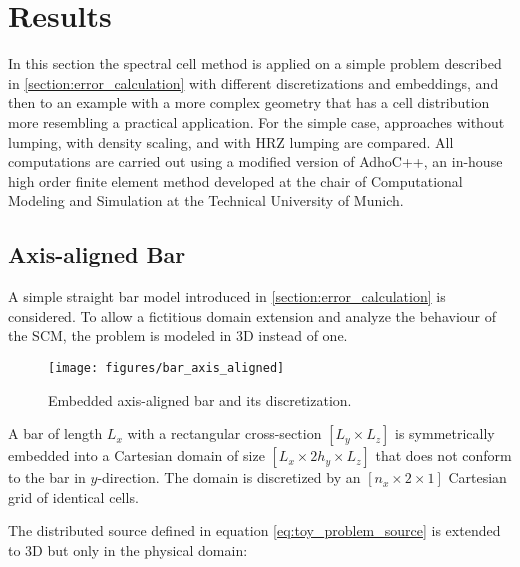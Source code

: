 %
\section{Results}
\label{section:results}
%

In this section the spectral cell method is applied on a simple problem described in \ref{section:error_calculation} with different discretizations and embeddings, and then to an example with a more complex geometry that has a cell distribution more resembling a practical application. For the simple case, approaches without lumping, with density scaling, and with HRZ lumping are compared. All computations are carried out using a modified version of AdhoC++, an in-house high order finite element method developed at the chair of Computational Modeling and Simulation at the Technical University of Munich.

%
\subsection{Axis-aligned Bar}
\label{section:axis_aligned_bar}
%

A simple straight bar model introduced in \ref{section:error_calculation} is considered. To allow a fictitious domain extension and analyze the behaviour of the SCM, the problem is modeled in 3D instead of one.

\begin{figure}[!h]
	\centering
	\texttt{[image: figures/bar\_axis\_aligned]}
	\caption{Embedded axis-aligned bar and its discretization.}
	\label{fig:bar_axis_aligned}
\end{figure}

A bar of length $L_x$ with a rectangular cross-section $[L_y \times L_z]$ is symmetrically embedded into a Cartesian domain of size $[L_x \times 2h_y \times L_z]$ that does not conform to the bar in $y$-direction. The domain is discretized by an $[n_x \times 2 \times 1]$ Cartesian grid of identical cells.

The distributed source defined in equation \ref{eq:toy_problem_source} is extended to 3D but only in the physical domain:


